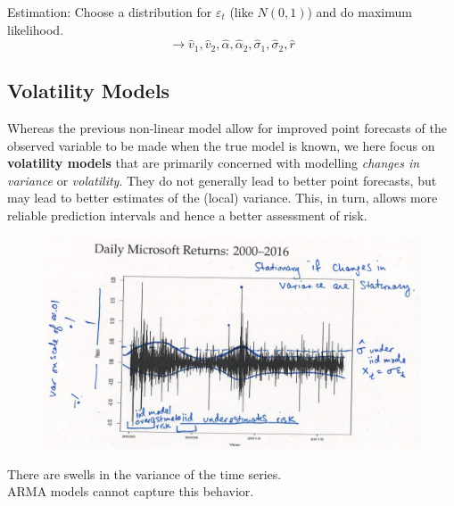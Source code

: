 Estimation: Choose a distribution for $\varepsilon_t$ (like $N(0,1)$) and do maximum likelihood. \[\rightarrow \hat{v}_1,\hat{v}_2,\hat{\alpha}, \hat{\alpha}_2, \hat{\sigma}_1, \hat{\sigma}_2, \hat{r}  \]

\subsection{Volatility Models}

Whereas the previous non-linear model allow for improved point forecasts of the observed variable to be made when the true model is known, we here focus on \textbf{volatility models} that are primarily concerned with modelling \textit{changes in variance} or \textit{volatility}. They do not generally lead to better point forecasts, but may lead to better estimates of the (local) variance. This, in turn, allows more reliable prediction intervals and hence a better assessment of risk. 

\begin{figure}[H]
\includegraphics[scale=0.4]{images/Screenshot 2024-05-13 at 09.11.00.jpg}
\centering
\end{figure}


There are swells in the variance of the time series. \\
ARMA models cannot capture this behavior. \\

